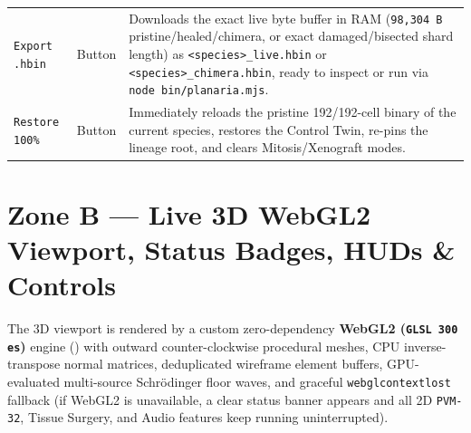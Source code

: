 \documentclass[10pt,letterpaper]{article}
\begin{document}
\begin{table}[ht]
\begin{tabularx}{\textwidth}{@{} L{3.3cm} L{2.8cm} Y @{}}
\texttt{Export .hbin} & Button & Downloads the exact live byte buffer in RAM (\texttt{98,304 B} pristine/healed/chimera, or exact damaged/bisected shard length) as \texttt{<species>\_live.hbin} or \texttt{<species>\_chimera.hbin}, ready to inspect or run via \texttt{node bin/planaria.mjs}. \\
\texttt{Restore 100\%} & Button & Immediately reloads the pristine 192/192-cell binary of the current species, restores the Control Twin, re-pins the lineage root, and clears Mitosis/Xenograft modes. \\
\bottomrule
\end{tabularx}
\end{table}

\FloatBarrier
\section{Zone B --- Live 3D WebGL2 Viewport, Status Badges, HUDs \& Controls}
\label{sec:zone-b}

The 3D viewport is rendered by a custom zero-dependency \textbf{WebGL2 (\texttt{GLSL 300 es})} engine () with outward counter-clockwise procedural meshes, CPU inverse-transpose normal matrices, deduplicated wireframe element buffers, GPU-evaluated multi-source Schr\"odinger floor waves, and graceful \texttt{webglcontextlost} fallback (if WebGL2 is unavailable, a clear status banner appears and all 2D \texttt{PVM-32}, Tissue Surgery, and Audio features keep running uninterrupted).
\end{document}
